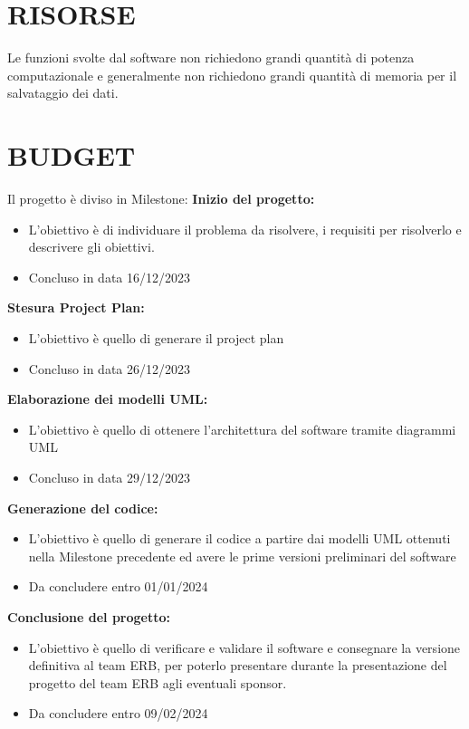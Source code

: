 \documentclass{report}
\begin{document}
\chapter{RISORSE}
Le funzioni svolte dal software non richiedono grandi quantità di potenza computazionale e generalmente non richiedono grandi quantità di memoria per il salvataggio dei dati.\\

\begingroup
\let\clearpage\relax
\chapter{BUDGET}
\endgroup

Il progetto è diviso in Milestone:
\textbf{Inizio del progetto:} 
\begin{itemize}
\item L'obiettivo è di individuare il problema da risolvere, i requisiti per risolverlo e descrivere gli obiettivi.
\item Concluso in data 16/12/2023
\end{itemize}

\textbf{Stesura Project Plan:}
\begin{itemize}
\item L'obiettivo è quello di generare il project plan
\item Concluso in data 26/12/2023
\end{itemize}

\textbf{Elaborazione dei modelli UML:}
\begin{itemize}
\item L'obiettivo è quello di ottenere l'architettura del software tramite diagrammi UML
\item Concluso in data 29/12/2023
\end{itemize}

\textbf{Generazione del codice:}
\begin{itemize}
\item L'obiettivo è quello di generare il codice a partire dai modelli UML ottenuti nella Milestone precedente ed avere le prime versioni preliminari del software
\item Da concludere entro 01/01/2024
\end{itemize}

\textbf{Conclusione del progetto:}
\begin{itemize}
\item L'obiettivo è quello di verificare e validare il software e consegnare la versione definitiva al team ERB, per poterlo presentare durante la presentazione del progetto del team ERB agli eventuali sponsor.
\item Da concludere entro 09/02/2024
\end{itemize}
\end{document}
